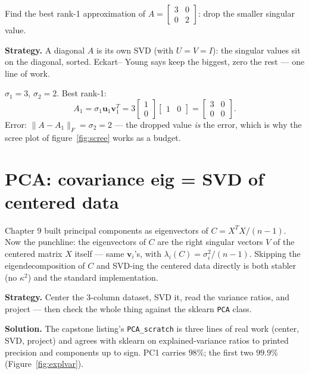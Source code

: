 \begin{example}\label{ex:rank1svd}
Find the best rank-1 approximation of
$A=\begin{bmatrix}3&0\\0&2\end{bmatrix}\!$: drop the smaller
singular value.
\par\smallskip
\textbf{Strategy.} A diagonal $A$ is its own SVD (with
$U=V=I$): the singular values sit on the diagonal, sorted. Eckart--
Young says keep the biggest, zero the rest --- one line of work.
\begin{solution}
$\sigma_1=3$, $\sigma_2=2$. Best rank-1:
\[
  A_1=\sigma_1\mathbf u_1\mathbf v_1^{T}
     =3\begin{bmatrix}1\\0\end{bmatrix}\begin{bmatrix}1&0\end{bmatrix}
     =\begin{bmatrix}3&0\\0&0\end{bmatrix}.
\]
Error: $\|A-A_1\|_F=\sigma_2=2$ --- the dropped value \emph{is} the
error, which is why the scree plot of figure~\ref{fig:scree} works as a
budget. \checkmark
\end{solution}
\end{example}

\section{PCA: covariance eig = SVD of centered data}\label{sec:pca}

Chapter 9 built principal components as eigenvectors of $C=X^{T}X/(n-1)$.
Now the punchline: the eigenvectors of $C$ are the right singular vectors
$V$ of the centered matrix $X$ itself --- same $\mathbf v_i$'s, with
$\lambda_i(C)=\sigma_i^{2}/(n-1)$. Skipping the eigendecomposition of $C$
and SVD-ing the centered data directly is both stabler (no $\kappa^{2}$)
and the standard implementation.

\begin{example}\label{ex:pca}
\textbf{Strategy.} Center the 3-column dataset, SVD it, read the
variance ratios, and project --- then check the whole thing against the
sklearn \texttt{PCA} class.

\textbf{Solution.} The capstone listing's \texttt{PCA\_scratch} is three
lines of real work (center, SVD, project) and agrees with sklearn on
explained-variance ratios to printed precision and components up to sign.
PC1 carries $98\%$; the first two $99.9\%$
(Figure~\ref{fig:explvar}).
\end{example}

